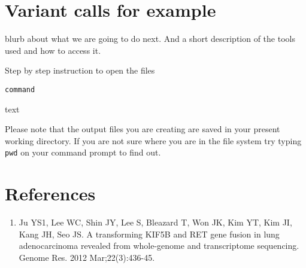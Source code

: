 \section{Variant calls for example}

blurb about what we are going to do next. And a short description of the tools used and how to access it.

\begin{steps}
Step by step instruction to open the files 

\begin{lstlisting}
command
\end{lstlisting}
\end{steps}

text

\begin{note}
Please note that the output files you are creating are saved in your present working directory. If you are not sure where you are in the file system try typing \texttt{pwd} on your command prompt to find out.
\end{note}


\newpage


\section{References}

\begin{enumerate}
  \item Ju YS1, Lee WC, Shin JY, Lee S, Bleazard T, Won JK, Kim YT, Kim JI, Kang JH, Seo JS. A transforming KIF5B and RET gene fusion in lung adenocarcinoma revealed from whole-genome and transcriptome sequencing. Genome Res. 2012 Mar;22(3):436-45. 
\end{enumerate}
